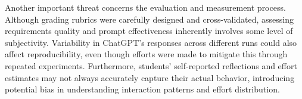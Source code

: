 Another important threat concerns the evaluation and measurement process. Although grading rubrics were carefully designed and cross-validated, assessing requirements quality and prompt effectiveness inherently involves some level of subjectivity. Variability in ChatGPT’s responses across different runs could also affect reproducibility, even though efforts were made to mitigate this through repeated experiments. Furthermore, students’ self-reported reflections and effort estimates may not always accurately capture their actual behavior, introducing potential bias in understanding interaction patterns and effort distribution.
